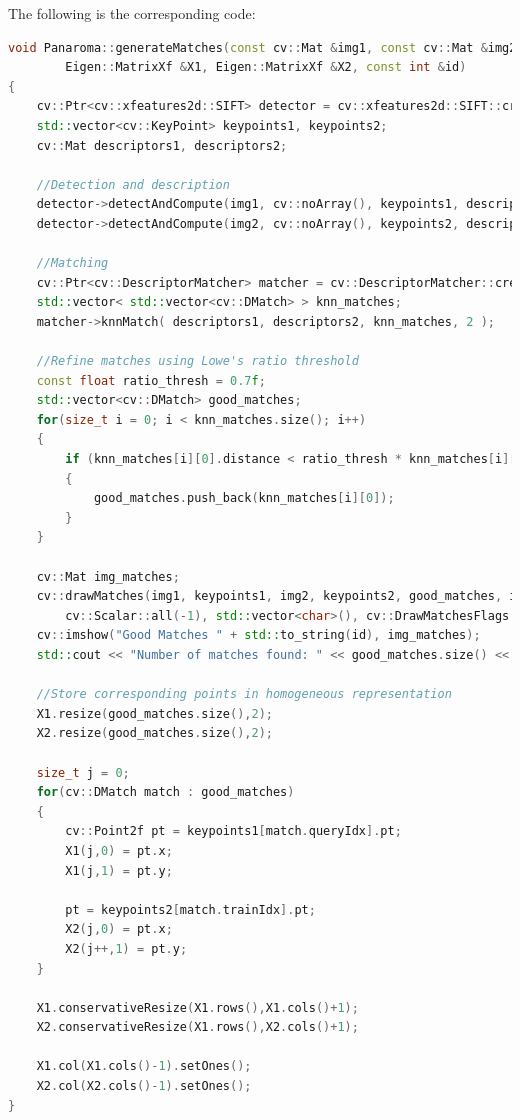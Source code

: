 \documentclass[a4paper,11]{article}
\begin{document}
  
  \noindent The following is the corresponding code:
  \begin{lstlisting}[language=C++]
void Panaroma::generateMatches(const cv::Mat &img1, const cv::Mat &img2,
    	Eigen::MatrixXf &X1, Eigen::MatrixXf &X2, const int &id)
{
    cv::Ptr<cv::xfeatures2d::SIFT> detector = cv::xfeatures2d::SIFT::create();
    std::vector<cv::KeyPoint> keypoints1, keypoints2;
    cv::Mat descriptors1, descriptors2;

    //Detection and description
    detector->detectAndCompute(img1, cv::noArray(), keypoints1, descriptors1);
    detector->detectAndCompute(img2, cv::noArray(), keypoints2, descriptors2);

    //Matching
    cv::Ptr<cv::DescriptorMatcher> matcher = cv::DescriptorMatcher::create(cv::DescriptorMatcher::FLANNBASED);
    std::vector< std::vector<cv::DMatch> > knn_matches;
    matcher->knnMatch( descriptors1, descriptors2, knn_matches, 2 );

    //Refine matches using Lowe's ratio threshold
    const float ratio_thresh = 0.7f;
    std::vector<cv::DMatch> good_matches;
    for(size_t i = 0; i < knn_matches.size(); i++)
    {
        if (knn_matches[i][0].distance < ratio_thresh * knn_matches[i][1].distance)
        {
            good_matches.push_back(knn_matches[i][0]);
        }
    }

    cv::Mat img_matches;
    cv::drawMatches(img1, keypoints1, img2, keypoints2, good_matches, img_matches, cv::Scalar::all(-1),
        cv::Scalar::all(-1), std::vector<char>(), cv::DrawMatchesFlags::NOT_DRAW_SINGLE_POINTS);
    cv::imshow("Good Matches " + std::to_string(id), img_matches);
    std::cout << "Number of matches found: " << good_matches.size() << std::endl;

    //Store corresponding points in homogeneous representation
    X1.resize(good_matches.size(),2);
    X2.resize(good_matches.size(),2);

    size_t j = 0;
    for(cv::DMatch match : good_matches)
    {
	    cv::Point2f pt = keypoints1[match.queryIdx].pt;
	    X1(j,0) = pt.x;
	    X1(j,1) = pt.y;

	    pt = keypoints2[match.trainIdx].pt;
	    X2(j,0) = pt.x;
	    X2(j++,1) = pt.y;
    }

    X1.conservativeResize(X1.rows(),X1.cols()+1);
    X2.conservativeResize(X1.rows(),X2.cols()+1);

    X1.col(X1.cols()-1).setOnes();
    X2.col(X2.cols()-1).setOnes();
}

  \end{lstlisting}
  \vspace{1em}
  
\end{document}

